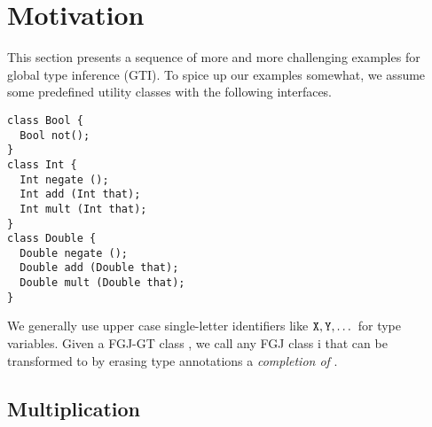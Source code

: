 \section{Motivation}
\label{sec:motivation}

This section presents a sequence of more and more challenging
examples for global type inference (GTI). To spice up our examples
somewhat, we assume some predefined utility classes with the following
interfaces.
\begin{lstlisting}[style=fgj]
class Bool {
  Bool not(); 
}
class Int {
  Int negate ();
  Int add (Int that);
  Int mult (Int that);
}
class Double {
  Double negate ();
  Double add (Double that);
  Double mult (Double that);
}
\end{lstlisting}

We generally use upper case single-letter identifiers like ${\tt X},
{\tt Y}, \dots$ for type variables.
Given a FGJ-GT class , 
we call any FGJ class \CL i that can be transformed to  by
erasing type annotations a \emph{completion of  }.

\subsection{Multiplication}
\label{sec:multiplication}

